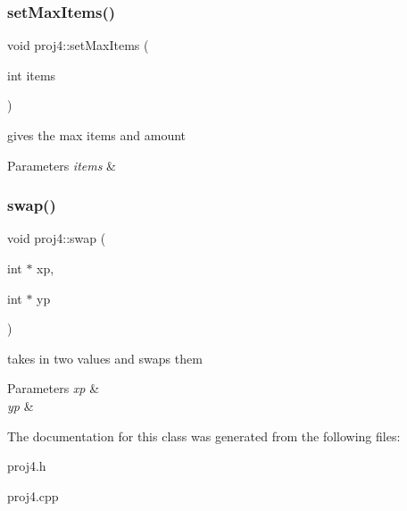 \subsubsection{\texorpdfstring{set\+Max\+Items()}{setMaxItems()}}
{\footnotesize\ttfamily void proj4\+::set\+Max\+Items (\begin{DoxyParamCaption}\item[{int}]{items }\end{DoxyParamCaption})}

gives the max items and amount 
\begin{DoxyParams}{Parameters}
{\em items} & \\
\hline
\end{DoxyParams}
\mbox{\label{classproj4_a5742145f4cf42d5054e2621161252872}} 
\subsubsection{\texorpdfstring{swap()}{swap()}}
{\footnotesize\ttfamily void proj4\+::swap (\begin{DoxyParamCaption}\item[{int $\ast$}]{xp,  }\item[{int $\ast$}]{yp }\end{DoxyParamCaption})}

takes in two values and swaps them 
\begin{DoxyParams}{Parameters}
{\em xp} & \\
\hline
{\em yp} & \\
\hline
\end{DoxyParams}


The documentation for this class was generated from the following files\+:\begin{DoxyCompactItemize}
\item 
proj4.\+h\item 
proj4.\+cpp\end{DoxyCompactItemize}
